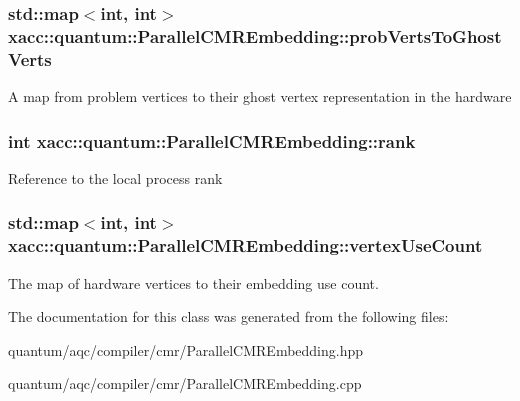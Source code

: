 \subsubsection[{\texorpdfstring{prob\+Verts\+To\+Ghost\+Verts}{probVertsToGhostVerts}}]{\setlength{\rightskip}{0pt plus 5cm}std\+::map$<$int, int$>$ xacc\+::quantum\+::\+Parallel\+C\+M\+R\+Embedding\+::prob\+Verts\+To\+Ghost\+Verts\hspace{0.3cm}{\ttfamily [protected]}}\hypertarget{a00093_ae16bfd68d24b66ac42c466bdd332d761}{}\label{a00093_ae16bfd68d24b66ac42c466bdd332d761}
A map from problem vertices to their ghost vertex representation in the hardware 
\subsubsection[{\texorpdfstring{rank}{rank}}]{\setlength{\rightskip}{0pt plus 5cm}int xacc\+::quantum\+::\+Parallel\+C\+M\+R\+Embedding\+::rank\hspace{0.3cm}{\ttfamily [protected]}}\hypertarget{a00093_a25e19b46e2ece70638325eefecf5c5b9}{}\label{a00093_a25e19b46e2ece70638325eefecf5c5b9}
Reference to the local process rank 
\subsubsection[{\texorpdfstring{vertex\+Use\+Count}{vertexUseCount}}]{\setlength{\rightskip}{0pt plus 5cm}std\+::map$<$int, int$>$ xacc\+::quantum\+::\+Parallel\+C\+M\+R\+Embedding\+::vertex\+Use\+Count\hspace{0.3cm}{\ttfamily [protected]}}\hypertarget{a00093_abfa929179ced4ddb425f76c238e560f8}{}\label{a00093_abfa929179ced4ddb425f76c238e560f8}
The map of hardware vertices to their embedding use count. 

The documentation for this class was generated from the following files\+:\begin{DoxyCompactItemize}
\item 
quantum/aqc/compiler/cmr/\+Parallel\+C\+M\+R\+Embedding.\+hpp\item 
quantum/aqc/compiler/cmr/\+Parallel\+C\+M\+R\+Embedding.\+cpp\end{DoxyCompactItemize}
